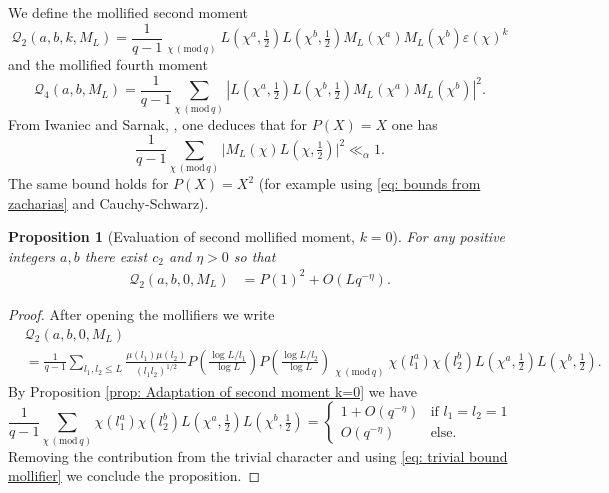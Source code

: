 \documentclass[12pt]{amsart}
\theoremstyle{plain}
\newtheorem{prop}[thm]{Proposition}
\theoremstyle{definition}
\theoremstyle{remark}
\numberwithin{equation}{section}
\newcommand\sumst{\mathop{{\sum}^\ast}\limits}
\newcommand{\mods}[1]{\,(\mathrm{mod}\,{#1})}
\renewcommand{\leq}{\leqslant}
\begin{document}
We define the mollified second moment 
\begin{equation}\label{def:mollifiedsecondmoment}
    \mathcal{Q}_2(a,b,k,M_L)= \frac{1}{q-1}\sumst_{\chi\mods{q}}L\left(\chi^a,\tfrac{1}{2}\right)L\left(\chi^b,\tfrac{1}{2}\right)M_L(\chi^a)M_L(\chi^b)\varepsilon(\chi)^k
\end{equation}
and the mollified fourth moment 
\begin{equation*}
    \mathcal{Q}_4(a,b,M_L)=\frac{1}{q-1}\sum_{\chi \mods{q}}\left\vert{L\left(\chi^a,\tfrac{1}{2}\right)L\left(\chi^b,\tfrac{1}{2}\right)M_L(\chi^a)M_L(\chi^b)}\right\vert^2.
\end{equation*}
 From Iwaniec and Sarnak, \cite{IwaniecSarnak+1999+941+952}, one deduces that for $P(X) = X$ one has
\begin{equation}\label{eq:mollifiedsecondmomentclassical}\frac{1}{q-1}\sum_{\chi\mods{q}}\vert{M_L(\chi)L(\chi,\tfrac 12)}\vert^2 \ll_\alpha 1.\end{equation}
The same bound holds for $P(X)=X^2$ (for example using \eqref{eq: bounds from zacharias} and Cauchy-Schwarz).
\begin{prop}[Evaluation of second mollified moment, $k=0$]\label{prop:secondmollifiedmomentk=0}For any positive integers $a,b$ there exist $c_2$ and $\eta >0$ so that 
    \begin{align*}
        \mathcal{Q}_2(a,b,0,M_L) &= P(1)^2 + O(Lq^{-\eta}).
         \end{align*}
\end{prop}

\begin{proof}After opening the mollifiers we write
   \begin{align*}
         & \mathcal{Q}_2(a,b,0,M_L) \\&=\frac{1}{q-1}  \sum_{l_1,l_2\leq L}\frac{\mu(l_1)\mu(l_2)}{(l_1l_2)^{1/2}}P\left(\frac{\log L/l_1}{\log L}\right)P\left(\frac{\log L/l_2}{\log L}\right)\sumst_{\chi\mods q}\chi(l_1^a)\chi(l_2^b)L(\chi^a,\tfrac 12)L(\chi^b,\tfrac 12).
    \end{align*}
By Proposition \ref{prop: Adaptation of second moment k=0} we have
$$\frac{1}{q-1}\sum_{\chi\mods q}\chi(l_1^a)\chi(l_2^b)L(\chi^a,\tfrac 12)L(\chi^b,\tfrac 12)=\begin{cases} 1 + O(q^{-\eta}) & \text{if }l_1=l_2=1 \\ 
       O(q^{-\eta}) &\text{else.} \end{cases}$$
Removing the contribution from the trivial character and using \eqref{eq: trivial bound mollifier} we conclude the proposition. 
\end{proof}
\end{document}
